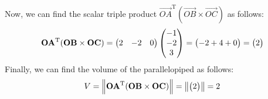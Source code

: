 \documentclass[a4paper, 12pt]{article}
\begin{document}
Now, we can find the scalar triple product $\vec{OA}^{\mathrm{T}}(\vec{OB} \times \vec{OC})$ as follows:
\begin{align}
    \mathbf{OA}^{\mathrm{T}}(\mathbf{OB} \times \mathbf{OC}) = \begin{pmatrix}2 & -2 & 0\end{pmatrix}\begin{pmatrix}-1 \\ -2 \\ 3\end{pmatrix} = \begin{pmatrix}-2 + 4 + 0\end{pmatrix} = \begin{pmatrix}2\end{pmatrix}
\end{align}
Finally, we can find the volume of the parallelopiped as follows:
\begin{align}
    V = \left\lVert\mathbf{OA}^{\mathrm{T}}(\mathbf{OB} \times \mathbf{OC})\right\rVert = \left\lVert\begin{pmatrix}2\end{pmatrix}\right\rVert = 2
\end{align}
\end{document}
